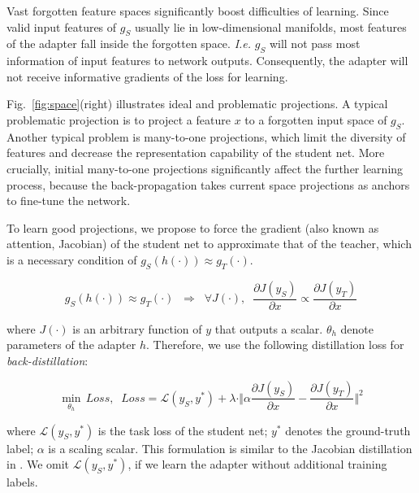 \documentclass[10pt,twocolumn,letterpaper]{article}
\begin{document}
Vast forgotten feature spaces significantly boost difficulties of learning. Since valid input features of {\small$g_{S}$} usually lie in low-dimensional manifolds, most features of the adapter fall inside the forgotten space. \emph{I.e.} $g_{S}$ will not pass most information of input features to network outputs. Consequently, the adapter will not receive informative gradients of the loss for learning.

Fig.~\ref{fig:space}(right) illustrates ideal and problematic projections. A typical problematic projection is to project a feature $x$ to a forgotten input space of {\small$g_{S}$}. Another typical problem is many-to-one projections, which limit the diversity of features and decrease the representation capability of the student net. More crucially, initial many-to-one projections significantly affect the further learning process, because the back-propagation takes current space projections as anchors to fine-tune the network.

To learn good projections, we propose to force the gradient (also known as attention, Jacobian) of the student net to approximate that of the teacher, which is a necessary condition of {\small$g_{S}(h(\cdot))\!\approx\!g_{T}(\cdot)$}.
\begin{small}
\begin{equation}
g_{S}(h(\cdot))\approx g_{T}(\cdot) \;\;\Longrightarrow\;\; \forall J(\cdot),\;\;\frac{\partial J(y_{S})}{\partial x}\propto \frac{\partial J(y_{T})}{\partial x}
\label{eqn:equal}
\end{equation}
\end{small}
where $J(\cdot)$ is an arbitrary function of $y$ that outputs a scalar. $\theta_{h}$ denote parameters of the adapter $h$. Therefore, we use the following distillation loss for \textit{back-distillation}:
\begin{small}
\begin{equation}
\!\underset{\theta_{h}}{\min}\,Loss,\;\; Loss=\mathcal{L}(y_{S},y^{*})+\lambda\cdot\Vert\alpha\frac{\partial J(y_{S})}{\partial x}\!-\!\frac{\partial J(y_{T})}{\partial x}\Vert^2\!\!
\end{equation}
\end{small}
where {\small$\mathcal{L}(y_{S},y^{*})$} is the task loss of the student net; {\small$y^{*}$} denotes the ground-truth label; $\alpha$ is a scaling scalar. This formulation is similar to the Jacobian distillation in \cite{distillJacobian}. We omit {\small$\mathcal{L}(y_{S},y^{*})$}, if we learn the adapter without additional training labels.
\end{document}
